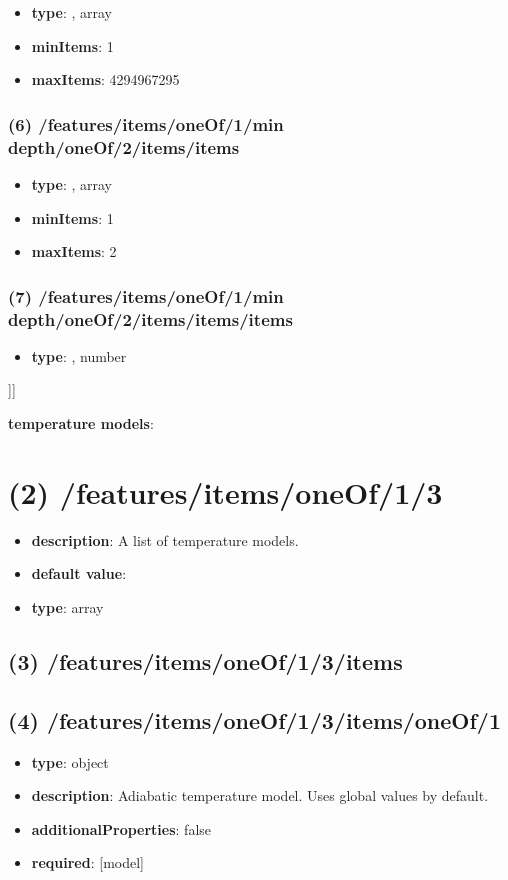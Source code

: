 \begin{itemize}[leftmargin=5em]\item {\bf type}: , array\item {\bf minItems}: 1
\item {\bf maxItems}: 4294967295
\end{itemize}\subsubsection{(6) /features/items/oneOf/1/min depth/oneOf/2/items/items}
\begin{itemize}[leftmargin=6em]\item {\bf type}: , array\item {\bf minItems}: 1
\item {\bf maxItems}: 2
\end{itemize}\subsubsection{(7) /features/items/oneOf/1/min depth/oneOf/2/items/items/items}
\begin{itemize}[leftmargin=7em]\item {\bf type}: , number\end{itemize}]]\item {\bf temperature models}: \section{(2) /features/items/oneOf/1/3}
\begin{itemize}[leftmargin=2em]\item {\bf description}: A list of temperature models.
\item {\bf default value}: 
\item {\bf type}: array
\end{itemize}\subsection{(3) /features/items/oneOf/1/3/items}

\subsection{(4) /features/items/oneOf/1/3/items/oneOf/1}
\begin{itemize}[leftmargin=4em]\item {\bf type}: object
\item {\bf description}: Adiabatic temperature model. Uses global values by default.
\item {\bf additionalProperties}: false
\item {\bf required}: [model]\end{itemize}
